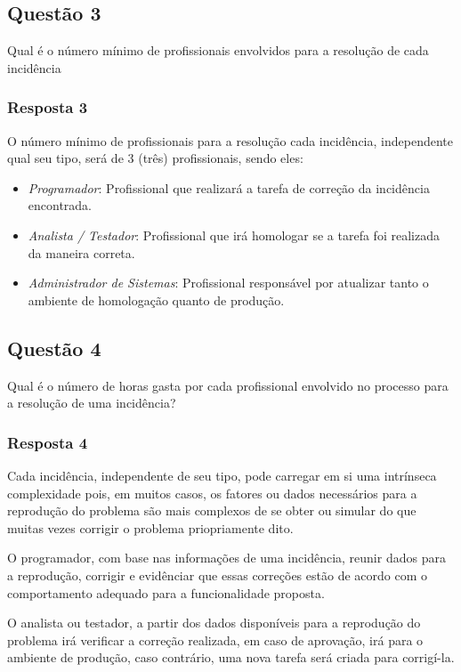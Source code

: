 \documentclass[11pt, a4paper]{article}
\begin{document}
\subsection{Questão 3}\label{sec:questao-3}
Qual é o número mínimo de profissionais envolvidos para a resolução de cada incidência
\subsubsection{Resposta 3}
O número mínimo de profissionais para a resolução cada incidência, independente qual seu tipo, será de 3 (três) profissionais, sendo eles:

\begin{itemize}
	\item \textit{Programador}: Profissional que realizará a tarefa de correção da incidência encontrada.
	\item \textit{Analista / Testador}: Profissional que irá homologar se a tarefa foi realizada da maneira correta.
	\item \textit{Administrador de Sistemas}: Profissional responsável por atualizar tanto o ambiente de homologação quanto de produção.
\end{itemize}

\subsection{Questão 4}\label{sec:questao-4}
Qual é o número de horas gasta por cada profissional envolvido no processo para a resolução de uma incidência?

\subsubsection{Resposta 4}
Cada incidência, independente de seu tipo, pode carregar em si uma intrínseca complexidade pois, em muitos casos, os fatores ou dados necessários  para a reprodução do problema são mais complexos de se obter ou simular do que muitas vezes corrigir o problema priopriamente dito.

O programador, com base nas informações de uma incidência, reunir dados para a reprodução, corrigir e evidênciar que essas correções estão de acordo com o comportamento adequado para a funcionalidade proposta.

O analista ou testador, a partir dos dados disponíveis para a reprodução do problema irá verificar a correção realizada, em caso de aprovação, irá para o ambiente de produção, caso contrário, uma nova tarefa será criada para corrigí-la.
\end{document}
